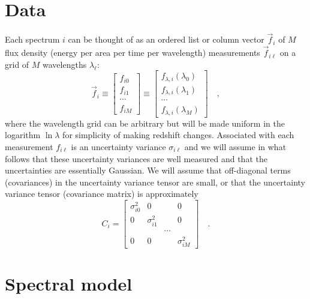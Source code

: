 \documentclass[12pt]{article}
\newcommand{\fluxvec}{\vec{f}}
\begin{document}
\section{Data}

Each spectrum $i$ can be thought of as an ordered list or column
vector $\fluxvec_i$ of $M$ flux density (energy per area per time per
wavelength) measurements $\fluxvec_{i\ell}$ on a grid of $M$
wavelengths $\lambda_{\ell}$:
\begin{equation}
\fluxvec_i
\equiv \left[\begin{array}{c} f_{i0} \\
                              f_{i1} \\
                              \cdots \\
                              f_{iM} \end{array}\right]
\equiv \left[\begin{array}{c} f_{\lambda,i}(\lambda_0) \\
                              f_{\lambda,i}(\lambda_1) \\
                                                \cdots \\
                              f_{\lambda,i}(\lambda_M) \end{array}\right]
\quad ,
\end{equation}
where the wavelength grid can be arbitrary but will be made uniform in
the logarithm $\ln\lambda$ for simplicity of making redshift changes.
Associated with each measurement $f_{i\ell}$ is an uncertainty
variance $\sigma_{i\ell}$ and we will assume in what follows that
these uncertainty variances are well measured and that the
uncertainties are essentially Gaussian.  We will assume that
off-diagonal terms (covariances) in the uncertainty variance tensor
are small, or that the uncertainty variance tensor (covariance matrix)
is approximately
\begin{equation}
C_i = \left[\begin{array}{cccc} \sigma_{i0}^2 & 0 & & 0 \\
                                0 & \sigma_{i1}^2 & & 0 \\
                                & & \cdots & \\
                                0 & 0 & & \sigma_{iM}^2 \end{array}\right]
\quad .
\end{equation}

\section{Spectral model}
\end{document}
